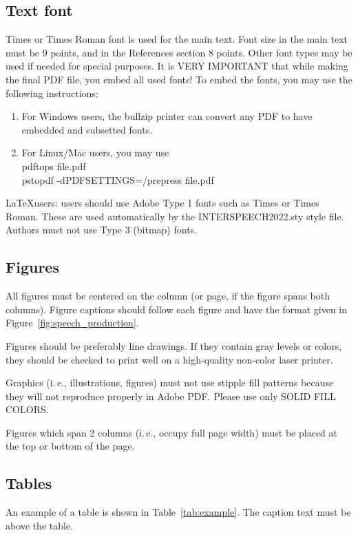 \documentclass[a4paper]{article}
\begin{document}
\subsection{Text font}

Times or Times Roman font is used for the main text. Font size in the main text must be 9 points, and in the References section 8 points. Other font types may be used if needed for special purposes. It is VERY IMPORTANT that while making the final PDF file, you embed all used fonts! To embed the fonts, you may use the following instructions:
\begin{enumerate}
\item For Windows users, the bullzip printer can convert any PDF to have embedded and subsetted fonts.
\item For Linux/Mac users, you may use \\
   pdftops file.pdf\\
   pstopdf -dPDFSETTINGS=/prepress file.pdf
\end{enumerate}

\LaTeX users: users should use Adobe Type 1 fonts such as Times or Times Roman. These are used automatically by the INTERSPEECH2022.sty style file. Authors must not use Type 3 (bitmap) fonts.

\subsection{Figures}

All figures must be centered on the column (or page, if the figure spans both columns). Figure captions should follow each figure and have the format given in Figure~\ref{fig:speech_production}.

Figures should be preferably line drawings. If they contain gray levels or colors, they should be checked to print well on a high-quality non-color laser printer.

Graphics (i.\,e., illustrations, figures) must not use stipple fill patterns because they will not reproduce properly in Adobe PDF. Please use only SOLID FILL COLORS.

Figures which span 2 columns (i.\,e., occupy full page width) must be placed at the top or bottom of the page.

\subsection{Tables}

An example of a table is shown in Table~\ref{tab:example}. The caption text must be above the table.
\end{document}
